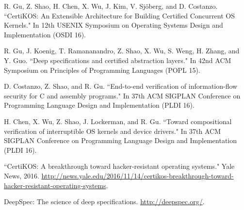 \documentclass[a4paper, 10pt]{article}
\begin{document}
\begin{footnotesize}
\begin{thebibliography}{}


R. Gu, Z. Shao, H. Chen, X. Wu, J. Kim, V. Sj\"{o}berg, and D. Costanzo. ``CertiKOS: An Extensible Architecture for Building Certified Concurrent OS Kernels." In 12th USENIX Symposium on Operating Systems Design and Implementation (OSDI 16). 

R. Gu, J. Koenig, T. Ramananandro, Z. Shao, X. Wu, S. Weng, H. Zhang, and Y. Guo. ``Deep specifications and certified abstraction layers." In
42nd ACM Symposium on Principles of Programming
Languages (POPL 15).

D. Costanzo,  Z. Shao, and R. Gu. ``End-to-end verification of information-flow security for C and assembly programs." In 37th ACM SIGPLAN Conference on Programming Language Design and Implementation (PLDI 16).

H. Chen,  X. Wu, Z. Shao, J. Lockerman, and R. Gu. ``Toward compositional verification of interruptible OS kernels and device drivers." In 37th ACM SIGPLAN Conference on Programming Language Design and Implementation (PLDI 16).



``CertiKOS: A breakthrough toward hacker-resistant operating systems." Yale News, 2016.
\url{http://news.yale.edu/2016/11/14/certikos-breakthrough-toward-hacker-resistant-operating-systems}.


DeepSpec: The science of deep specifications. 
\url{http://deepspec.org/}.


\end{thebibliography}
\end{footnotesize}
\end{document}
